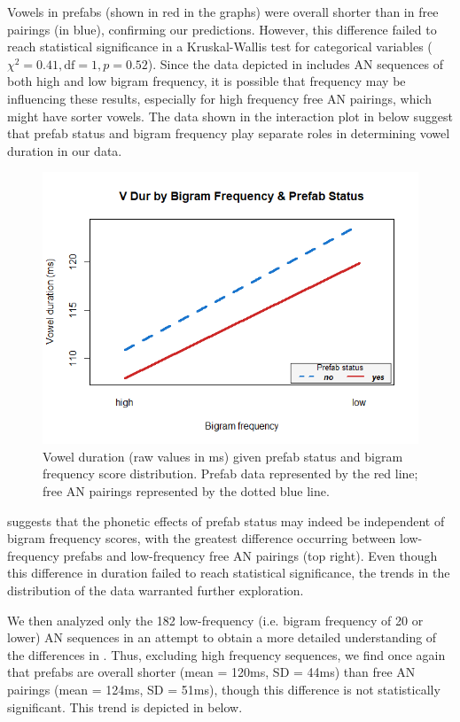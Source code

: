 \documentclass[output=paper]{langscibook}
\begin{document}
Vowels in prefabs (shown in red in the graphs) were overall shorter than in free pairings (in blue), confirming our predictions. However, this difference failed to reach statistical significance in a Kruskal-Wallis test for categorical variables ($\chi^2 = 0.41, \text{df} = 1, p = 0.52$). Since the data depicted in  includes AN sequences of both high and low bigram frequency, it is possible that frequency may be influencing these results, especially for high frequency free AN pairings, which might have sorter vowels. The data shown in the interaction plot in  below suggest that prefab status and bigram frequency play separate roles in determining vowel duration in our data.


\begin{figure}
\includegraphics[width=\textwidth]{figures/bybee-img001.png}
\caption{\label{fig:bybee:2}Vowel duration (raw values in ms) given prefab status and bigram frequency score distribution. Prefab data represented by the red line; free AN pairings represented by the dotted blue line.}
\end{figure}

 suggests that the phonetic effects of prefab status may indeed be independent of bigram frequency scores, with the greatest difference occurring between low-frequency prefabs and low-frequency free AN pairings (top right). Even though this difference in duration failed to reach statistical significance, the trends in the distribution of the data warranted further exploration.

We then analyzed only the 182 low-frequency (i.e. bigram frequency of 20 or lower) AN sequences in an attempt to obtain a more detailed understanding of the differences in . Thus, excluding high frequency sequences, we find once again that prefabs are overall shorter (mean = 120ms, SD = 44ms) than free AN pairings (mean = 124ms, SD = 51ms), though this difference is not statistically significant. This trend is depicted in  below.
\end{document}
